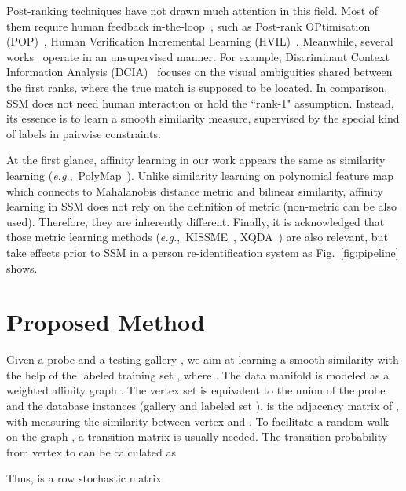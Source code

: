 \documentclass[10pt,twocolumn,letterpaper]{article}
\def\eg{\emph{e.g.}}
\begin{document}
Post-ranking techniques have not drawn much attention in this field. Most of them require human feedback in-the-loop~\cite{ali2010interactive,hirzer2011person}, such as Post-rank OPtimisation (POP)~\cite{POP}, Human Verification Incremental Learning (HVIL)~\cite{wang2016human}. Meanwhile, several works~\cite{an2016person,leng2015person} operate in an unsupervised manner. For example, Discriminant Context Information Analysis (DCIA)~\cite{DCIA} focuses on the visual ambiguities shared between the first ranks, where the true match is supposed to be located. In comparison, SSM does not need human interaction or hold the ``rank-1" assumption. Instead, its essence is to learn a smooth similarity measure, supervised by the special kind of labels in pairwise constraints.

At the first glance, affinity learning in our work appears the same as similarity learning (\eg,~PolyMap~\cite{PolyMap}). Unlike similarity learning on polynomial feature map~\cite{SCSP} which connects to Mahalanobis distance metric and bilinear similarity, affinity learning in SSM does not rely on the definition of metric (non-metric can be also used). Therefore, they are inherently different.
Finally, it is acknowledged that those metric learning methods (\eg,~KISSME~\cite{KISSME}, XQDA~\cite{XQDA}) are also relevant, but take effects prior to SSM in a person re-identification system as Fig.~\ref{fig:pipeline} shows.

\section{Proposed Method} \label{sec:proposed}
Given a probe  and a testing gallery , we aim at learning a smooth similarity  with the help of the labeled training set , where .
The data manifold is modeled as a weighted affinity graph . The vertex set  is equivalent to the union of the probe  and the database instances (gallery  and labeled set ).  is the adjacency matrix of , with  measuring the similarity between vertex  and .
To facilitate a random walk~\cite{random_walk} on the graph , a transition matrix  is usually needed. The transition probability from vertex  to  can be calculated as

Thus,  is a row stochastic matrix.
\end{document}
